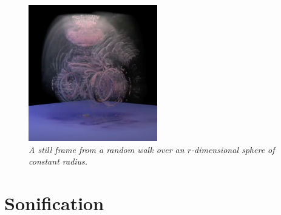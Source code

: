 \begin{figure}
	\centering
	\includegraphics[width=0.5\textwidth]{chap5/figures/sphere_grab.png}
	\caption{\em A still frame from a random walk over an $r$-dimensional sphere of constant radius.}
	\label{fig:sphere}
\end{figure}

\section{Sonification}

